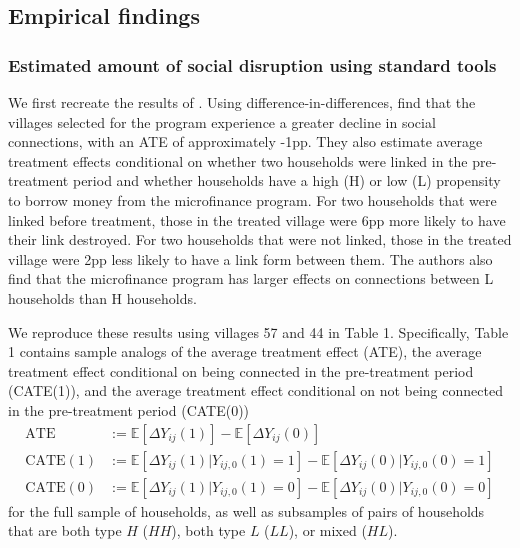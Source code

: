 \documentclass[12pt]{article}
\theoremstyle{definition}
\begin{document}


\subsection{Empirical findings}
\subsubsection{Estimated amount of social disruption using standard tools }
We first recreate the results of \cite{banerjee2021changes} . Using difference-in-differences, \cite{banerjee2021changes} find that the villages selected for the program experience a greater decline in social connections, with an ATE of approximately -1pp. They also estimate average treatment effects conditional on whether two households were linked in the pre-treatment period and whether households have a high (H) or low (L) propensity to borrow money from the microfinance program. For two households that were linked before treatment, those in the treated village were 6pp more likely to have their link destroyed. For two households that were not linked, those in the treated village were 2pp less likely to have a link form between them. The authors also find that the microfinance program has larger effects on connections between L households than H households.   

We reproduce these results using villages 57 and 44 in Table 1. Specifically, Table 1 contains sample analogs of the average treatment effect (ATE), the average treatment effect conditional on being connected in the pre-treatment period (CATE(1)), and the average treatment effect conditional on not being connected in the pre-treatment period (CATE(0))
\begin{align*}
		\text{ATE} &:= \mathbb{E}\left[\Delta Y_{ij}(1)\right] - \mathbb{E}\left[ \Delta Y_{ij}(0)\right] \\
		\text{CATE}(1) &:=  \mathbb{E}\left[\Delta Y_{ij}(1)| Y_{ij,0}(1) = 1\right]  - \mathbb{E}\left[\Delta Y_{ij}(0)| Y_{ij,0}(0) = 1\right] 	\\
		\text{CATE}(0) &:=   \mathbb{E}\left[\Delta Y_{ij}(1)| Y_{ij,0}(1) = 0\right]  - \mathbb{E}\left[\Delta Y_{ij}(0)| Y_{ij,0}(0) = 0\right] \end{align*} 
for the full sample of households, as well as subsamples of pairs of households that are both type $H$ ($HH$), both type $L$ ($LL$), or mixed ($HL$). 
\end{document}
